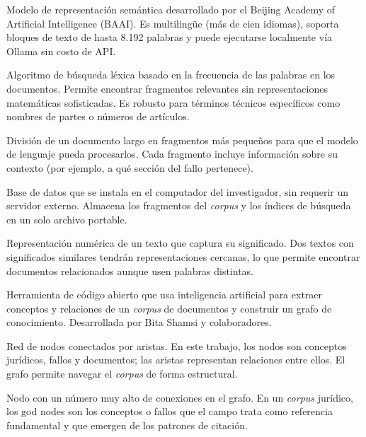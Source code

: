 \documentclass[12pt,a4paper]{article}
\begin{document}
\begin{description}[leftmargin=3.2cm, style=sameline, itemsep=6pt]

\item[bge-m3] Modelo de representación semántica desarrollado por el Beijing
Academy of Artificial Intelligence (BAAI). Es multilingüe (más de cien idiomas),
soporta bloques de texto de hasta 8.192 palabras y puede ejecutarse localmente
vía Ollama sin costo de API.

\item[BM25] Algoritmo de búsqueda léxica basado en la frecuencia de las palabras
en los documentos. Permite encontrar fragmentos relevantes sin representaciones
matemáticas sofisticadas. Es robusto para términos técnicos específicos como
nombres de partes o números de artículos.

\item[\textit{chunking}] División de un documento largo en fragmentos más pequeños para
que el modelo de lenguaje pueda procesarlos. Cada fragmento incluye información
sobre su contexto (por ejemplo, a qué sección del fallo pertenece).

\item[DuckDB] Base de datos que se instala en el computador del investigador,
sin requerir un servidor externo. Almacena los fragmentos del \textit{corpus} y los
índices de búsqueda en un solo archivo portable.

\item[\textit{embedding} / vector semántico] Representación numérica de un texto que
captura su significado. Dos textos con significados similares tendrán
representaciones cercanas, lo que permite encontrar documentos relacionados
aunque usen palabras distintas.

\item[Graphify] Herramienta de código abierto que usa inteligencia artificial
para extraer conceptos y relaciones de un \textit{corpus} de documentos y construir un
grafo de conocimiento. Desarrollada por Bita Shamsi y colaboradores.

\item[grafo de conocimiento] Red de nodos conectados por aristas. En este
trabajo, los nodos son conceptos jurídicos, fallos y documentos; las aristas
representan relaciones entre ellos. El grafo permite navegar el \textit{corpus} de forma
estructural.

\item[god node] Nodo con un número muy alto de conexiones en el grafo. En un
\textit{corpus} jurídico, los god nodes son los conceptos o fallos que el campo trata
como referencia fundamental y que emergen de los patrones de citación.


\end{description}
\end{document}

